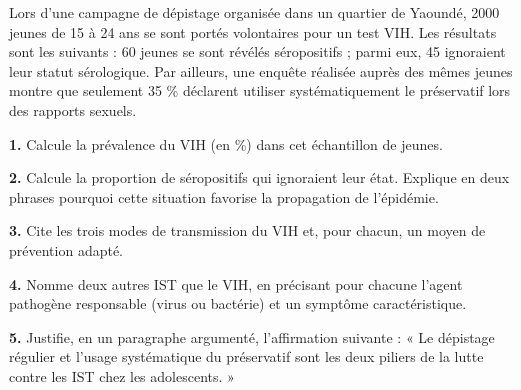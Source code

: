 \documentclass[11pt]{article}
\begin{document}
\begin{exercice}
Lors d'une campagne de dépistage organisée dans un quartier de Yaoundé, \num{2000} jeunes de 15 à 24 ans se sont portés volontaires pour un test VIH. Les résultats sont les suivants : 60 jeunes se sont révélés séropositifs ; parmi eux, 45 ignoraient leur statut sérologique. Par ailleurs, une enquête réalisée auprès des mêmes jeunes montre que seulement 35 \% déclarent utiliser systématiquement le préservatif lors des rapports sexuels.

\textbf{1.} Calcule la prévalence du VIH (en \%) dans cet échantillon de jeunes.

\textbf{2.} Calcule la proportion de séropositifs qui ignoraient leur état. Explique en deux phrases pourquoi cette situation favorise la propagation de l'épidémie.

\textbf{3.} Cite les trois modes de transmission du VIH et, pour chacun, un moyen de prévention adapté.

\textbf{4.} Nomme deux autres IST que le VIH, en précisant pour chacune l'agent pathogène responsable (virus ou bactérie) et un symptôme caractéristique.

\textbf{5.} Justifie, en un paragraphe argumenté, l'affirmation suivante : « Le dépistage régulier et l'usage systématique du préservatif sont les deux piliers de la lutte contre les IST chez les adolescents. »
\end{exercice}
\end{document}
